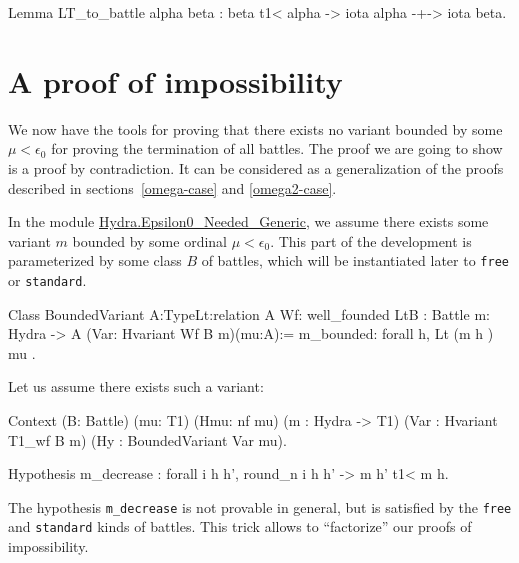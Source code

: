 \begin{Coqsrc}
Lemma LT_to_battle alpha beta :
    beta t1< alpha ->  iota alpha -+-> iota beta.
\end{Coqsrc}

\section{A  proof of impossibility}

We now have  the tools for proving that  there exists no variant bounded by some $\mu<\epsilon_0$ for proving the termination   of all battles. The proof we are going to show is a proof by contradiction. It  can
 be considered as a generalization of the
proofs described in  sections~\vref{omega-case} and \vref{omega2-case}.



In the module
\href{../theories/html/hydras.Hydra.Epsilon0_Needed_Generic.html}{Hydra.Epsilon0\_Needed\_Generic}, we assume there exists some variant $m$ bounded by some ordinal $\mu<\epsilon_0$. This part of the development is parameterized by some class $B$ of battles, which will be instantiated later to \texttt{free} or \texttt{standard}.




\begin{Coqsrc}
Class BoundedVariant {A:Type}{Lt:relation A}
      {Wf: well_founded Lt}{B : Battle}
      {m: Hydra -> A} (Var: Hvariant  Wf  B m)(mu:A):=
  {
  m_bounded: forall h, Lt (m h ) mu
  }.
\end{Coqsrc}

Let us assume there exists such a variant:

\begin{Coqsrc}
Context (B: Battle)
          (mu: T1)
          (Hmu: nf mu)
          (m : Hydra -> T1)
          (Var : Hvariant  T1_wf B m)
          (Hy : BoundedVariant  Var mu).

  Hypothesis m_decrease : forall  i h h',
      round_n i h h'   -> m h' t1< m h.
\end{Coqsrc}

\label{remark:m-decrease}
\begin{remark}
  The hypothesis \texttt{m\_decrease} is not provable  in general, but is satisfied by
the  \texttt{free} and \texttt{standard} kinds of battles. This trick allows to 
``factorize'' our proofs  of impossibility.
\end{remark}


